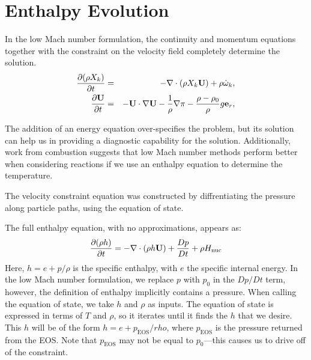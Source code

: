 \section{Enthalpy Evolution}

In the low Mach number formulation, the continuity and momentum
equations together with the constraint on the velocity field
completely determine the solution.
\begin{eqnarray}
\frac{\partial(\rho X_k)}{\partial t} &=& -\nabla\cdot(\rho X_k{\bf U}) + 
\rho\dot{\omega}_k,\label{eq:species}\\
\frac{\partial{\bf U}}{\partial t} &=& -{\bf U}\cdot\nabla{\bf U}  - 
  \frac{1}{\rho}\nabla\pi - 
  \frac{\rho-\rho_0}{\rho} g{\bf e}_r,\label{eq:momentum}
\end{eqnarray}

The addition of an energy equation over-specifies the problem, but its
solution can help us in providing a diagnostic capability for the
solution.  Additionally, work from combustion suggests that low Mach
number methods perform better when considering reactions if we use
an enthalpy equation to determine the temperature.

The velocity constraint equation was constructed by diffrentiating 
the pressure along particle paths, using the equation of state.  


The full enthalpy equation, with no approximations, appears as:
\begin{equation}
\frac{\partial(\rho h)}{\partial t} = -\nabla\cdot(\rho h{\bf U}) + 
  \frac{Dp}{Dt} + \rho{H_{\rm nuc}} \label{eq:enthalpy}
\end{equation}
Here, $h = e + p/\rho$ is the specific enthalpy, with $e$ the specific
internal energy.  In the low Mach number formulation, we replace $p$
with $p_0$ in the $Dp/Dt$ term, however, the definition of enthalpy
implicitly contains a pressure.  When calling the equation of state,
we take $h$ and $\rho$ as inputs.  The equation of state is expressed
in terms of $T$ and $\rho$, so it iterates until it finds the $h$ that
we desire.  This $h$ will be of the form $h = e + p_\mathrm{EOS}/rho$,
where $p_\mathrm{EOS}$ is the pressure returned from the EOS.  Note that
$p_\mathrm{EOS}$ may not be equal to $p_0$---this causes us to drive
off of the constraint. 

